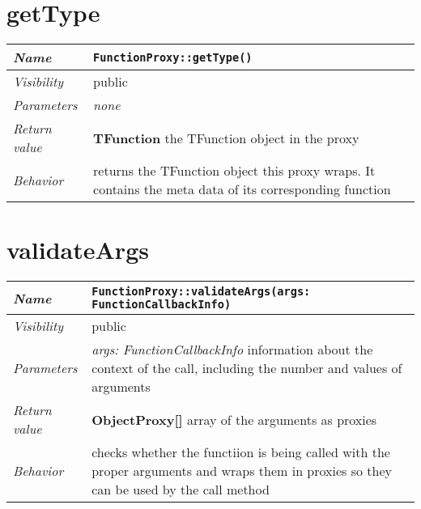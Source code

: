 \section{getType}
\begin{longtable}{p{3cm} @{\hskip 1cm} p{12cm}}
	\hline

	\textit{Name} & \texttt{FunctionProxy::getType()}\\
	\hline

	\textit{Visibility} & public\\
	\hline

	\textit{Parameters} & \textit{none}\\
	\hline

	\textit{Return value} & \textbf{ TFunction} the TFunction object in the proxy \\
	\hline

	\textit{Behavior} & returns the TFunction object this proxy wraps. 
			It contains the meta data of its corresponding function \\
	\hline

\end{longtable} \pagebreak

\section{validateArgs}
\begin{longtable}{p{3cm} @{\hskip 1cm} p{12cm}}
	\hline

	\textit{Name} & \texttt{FunctionProxy::validateArgs(args: FunctionCallbackInfo)}\\
	\hline

	\textit{Visibility} & public\\
	\hline

	\textit{Parameters} & \textit{args: FunctionCallbackInfo} information about the context of the call, including the  number and values of arguments \\
	\hline

	\textit{Return value} & \textbf{ ObjectProxy[]} array of the arguments as proxies\\
	\hline

	\textit{Behavior} & checks whether the functiion is being called with the proper arguments and wraps them in proxies so they can be used by the call method \\
	\hline

\end{longtable} \pagebreak

